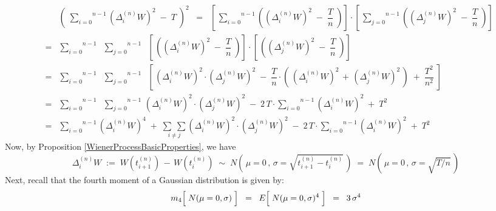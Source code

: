 \begin{eqnarray*}
&&
	\left(\;\overset{n-1}{\underset{i=0}{\sum}} \left(\Delta^{(n)}_{i}W\right)^{2} \; - \; T\;\right)^{2}
\;\; = \;\;
	\left[\,\overset{n-1}{\underset{i=0}{\sum}} \left(\left(\Delta^{(n)}_{i}W\right)^{2} \; - \; \dfrac{T}{n}\;\right)\right]
	\cdot
	\left[\,\overset{n-1}{\underset{j=0}{\sum}} \left(\left(\Delta^{(n)}_{j}W\right)^{2} \; - \; \dfrac{T}{n}\;\right)\right]
\\
& = &
	\overset{n-1}{\underset{i=0}{\sum}}\;\;
	\overset{n-1}{\underset{j=0}{\sum}}\;\;
	\left[\,\left(\left(\Delta^{(n)}_{i}W\right)^{2} \; - \; \dfrac{T}{n}\;\right)\right]
	\cdot
	\left[\,\left(\left(\Delta^{(n)}_{j}W\right)^{2} \; - \; \dfrac{T}{n}\;\right)\right]
\\
& = &
	\overset{n-1}{\underset{i=0}{\sum}}\;\;
	\overset{n-1}{\underset{j=0}{\sum}}\;\;
	\left[\,
		\left(\Delta^{(n)}_{i}W\right)^{2} \cdot \left(\Delta^{(n)}_{j}W\right)^{2}
		\; - \;
		\dfrac{T}{n} \cdot \left(\, \left(\Delta^{(n)}_{i}W\right)^{2} \,+\, \left(\Delta^{(n)}_{j}W\right)^{2}\,\right)
		 \; + \; \dfrac{T^{2}}{n^{2}}
		\;\right]
\\
& = &
	\overset{n-1}{\underset{i=0}{\sum}}\;\;
	\overset{n-1}{\underset{j=0}{\sum}}\,
	\left(\Delta^{(n)}_{i}W\right)^{2} \cdot \left(\Delta^{(n)}_{j}W\right)^{2}
	\; - \;
		2\,T \cdot \overset{n-1}{\underset{i=0}{\sum}}\left(\Delta^{(n)}_{i}W\right)^{2}
	\; + \;
		T^{2}
\\
& = &
	\overset{n-1}{\underset{i=0}{\sum}}
	\left(\Delta^{(n)}_{i}W\right)^{4}
	\; + \;
		\underset{i \neq j}{\sum\;\sum}
		\left(\Delta^{(n)}_{i}W\right)^{2} \cdot \left(\Delta^{(n)}_{j}W\right)^{2}
	\; - \;
		2\,T \cdot \overset{n-1}{\underset{i=0}{\sum}}\left(\Delta^{(n)}_{i}W\right)^{2}
	\; + \;
		T^{2}
\end{eqnarray*}
Now, by Proposition \ref{WienerProcessBasicProperties}, we have
\begin{equation*}
\Delta^{(n)}_{i}W
\; :=\;
	W(t^{(n)}_{i+1}) \,-\, W(t^{(n)}_{i})
\;\sim\;
	N\!\left(\,\mu=0\,,\,\sigma=\sqrt{t^{(n)}_{i+1}-t^{(n)}_{i}}\,\right)
\; =\;
	N\!\left(\,\mu=0\,,\,\sigma=\sqrt{T/n}\,\right)
\end{equation*}
Next, recall that the fourth moment of a Gaussian distribution is given by:
\begin{equation*}
m_{4}\!\left[\;\overset{{\color{white}.}}{N}(\mu = 0,\sigma)\;\right]
\;\; = \;\;
	E\!\left[\;\overset{{\color{white}.}}{N}(\mu = 0,\sigma)^{4}\;\right]
\;\; = \;\;
	3\,\sigma^{4}
\end{equation*}
